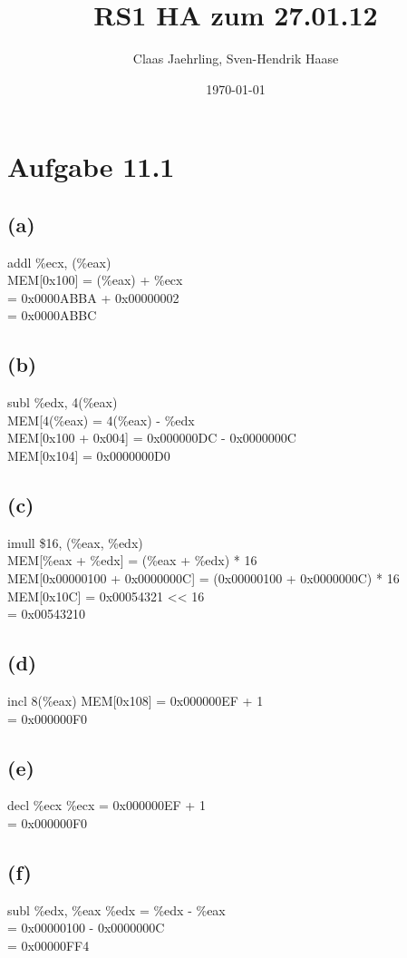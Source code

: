 \documentclass[12pt]{article}
\author{Claas Jaehrling, Sven-Hendrik Haase}
\title{RS1 HA zum 27.01.12}
\date{\today}
\begin{document}
\setcounter{secnumdepth}{0}
\maketitle

\section{Aufgabe 11.1}
\subsection{(a)}
addl \%ecx, (\%eax) \\
MEM[0x100] = (\%eax) + \%ecx \\
= 0x0000ABBA + 0x00000002 \\
= 0x0000ABBC
\subsection{(b)}
subl \%edx, 4(\%eax) \\
MEM[4(\%eax) = 4(\%eax) - \%edx \\
MEM[0x100 + 0x004] = 0x000000DC - 0x0000000C \\
MEM[0x104] = 0x0000000D0
\subsection{(c)}
imull \$16, (\%eax, \%edx) \\
MEM[\%eax + \%edx] = (\%eax + \%edx) * 16 \\
MEM[0x00000100 + 0x0000000C] = (0x00000100 + 0x0000000C) * 16 \\
MEM[0x10C] = 0x00054321 << 16 \\
= 0x00543210
\subsection{(d)}
incl 8(\%eax)
MEM[0x108] = 0x000000EF + 1 \\
= 0x000000F0
\subsection{(e)}
decl \%ecx
\%ecx = 0x000000EF + 1 \\
= 0x000000F0
\subsection{(f)}
subl \%edx, \%eax
\%edx = \%edx - \%eax \\
= 0x00000100 - 0x0000000C \\
= 0x00000FF4
\end{document}

